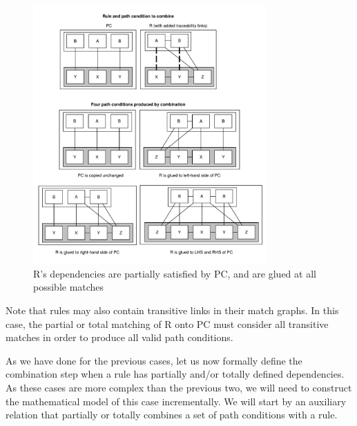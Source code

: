 \begin{figure}[tb] \centering \includegraphics[width=0.8\textwidth]{./figures/building_path_conditions/multiple_partial_satisfied_dependencies.pdf}
	\caption{R's dependencies are partially satisfied by PC, and are glued at all possible matches}
	\label{fig:multiple_partial_satisfied_dependencies}
\end{figure}


Note that rules may also contain transitive links in their match graphs. In this case, the partial or total matching of R onto PC must consider all transitive matches in order to produce all valid path conditions.

As we have done for the previous cases, let us now formally define the combination step when a rule has partially and/or totally defined dependencies. As these cases are more complex than the previous two, we will need to construct the mathematical model of this case incrementally. We will start by an auxiliary relation that partially or totally combines a set of path conditions with a rule.

